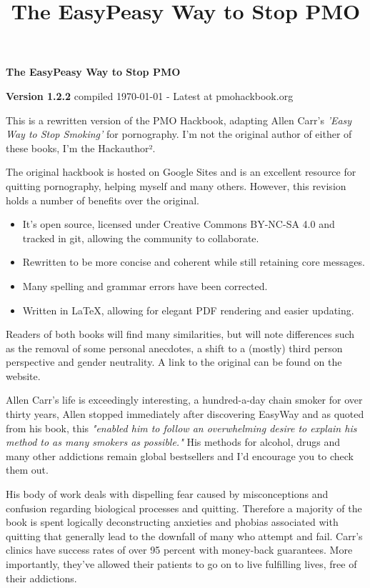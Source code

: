 \documentclass[easypeasy.tex]{subfiles}
\title {The EasyPeasy Way to Stop PMO}
\begin{document}
\thispagestyle{empty}

\begin{center}
  {\Huge\bfseries The EasyPeasy Way to Stop PMO \par}
  {\small \textbf{Version 1.2.2} compiled {\today} - Latest at pmohackbook.org}
\end{center}

This is a rewritten version of the PMO Hackbook, adapting Allen Carr's \textit{'Easy Way to Stop Smoking'} for pornography. I'm not the original author of either of these books, I'm the Hackauthor².

The original hackbook is hosted on Google Sites and is an excellent resource for quitting pornography, helping myself and many others. However, this revision holds a number of benefits over the original.
\begin{itemize}
\item It's open source, licensed under Creative Commons BY-NC-SA 4.0 and tracked in git, allowing the community to collaborate.
\item Rewritten to be more concise and coherent while still retaining core messages.
\item Many spelling and grammar errors have been corrected.
\item Written in LaTeX, allowing for elegant PDF rendering and easier updating.
\end{itemize}

Readers of both books will find many similarities, but will note differences such as the removal of some personal anecdotes, a shift to a (mostly) third person perspective and gender neutrality. A link to the original can be found on the website.

Allen Carr's life is exceedingly interesting, a hundred-a-day chain smoker for over thirty years, Allen stopped immediately after discovering EasyWay and as quoted from his book, this \textit{"enabled him to follow an overwhelming desire to explain his method to as many smokers as possible."} His methods for alcohol, drugs and many other addictions remain global bestsellers and I'd encourage you to check them out.

His body of work deals with dispelling fear caused by misconceptions and confusion regarding biological processes and quitting. Therefore a majority of the book is spent logically deconstructing anxieties and phobias associated with quitting that generally lead to the downfall of many who attempt and fail. Carr's clinics have success rates of over 95 percent with money-back guarantees. More importantly, they've allowed their patients to go on to live fulfilling lives, free of their addictions.
\end{document}
